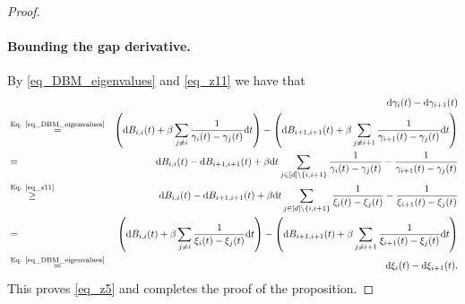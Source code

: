 \documentclass[11pt,letterpaper]{article}
\begin{document}
\begin{proof}
\paragraph{Bounding the gap derivative.}
%
By \eqref{eq_DBM_eigenvalues} and \eqref{eq_z11} we have that
%
\begin{eqnarray*}
& & \!\!\!\! \!\!\!\! \!\!\!\! \!\!\!\!  \!\!\!\! \!\!\!\! \!\!\!\! \!\!\!\!  \!\!\!\! \!\!\!\! \mathrm{d} \gamma_i(t) - \mathrm{d} \gamma_{i+1} (t) \nonumber\\
%
&\stackrel{\textrm{Eq. \eqref{eq_DBM_eigenvalues}}}{=}&  \left(\mathrm{d}B_{i, i}(t) +  \beta \sum_{j \neq i} \frac{1}{\gamma_i(t) - \gamma_j(t)} \mathrm{d}t \right) -  \left(\mathrm{d}B_{i+1, i+1}(t) +  \beta \sum_{j \neq i+1} \frac{1}{\gamma_{i+1}(t) - \gamma_j(t)} \mathrm{d}t \right)\\
%
&=& \mathrm{d}B_{i, i}(t)  - \mathrm{d}B_{i+1, i+1}(t)  + \beta  \mathrm{d}t  \sum_{j \in [d] \backslash \{i, i+1\}}   \frac{1}{\gamma_i(t) - \gamma_j(t)} -  \frac{1}{\gamma_{i+1}(t) - \gamma_j(t)}\\
%
&\stackrel{\textrm{Eq. \eqref{eq_z11}}}{\geq} &  \mathrm{d}B_{i, i}(t)  - \mathrm{d}B_{i+1, i+1}(t)  + \beta  \mathrm{d}t  \sum_{j \in [d] \backslash \{i, i+1\}}  \frac{1}{\xi_i(t)- \xi_{j}(t)} - \frac{1}{\xi_{i+1}(t)- \xi_{j}(t)}\\
%
&=&  \left(\mathrm{d}B_{i, i}(t) +  \beta \sum_{j \neq i} \frac{1}{\xi_i(t) - \xi_j(t)} \mathrm{d}t \right) -  \left(\mathrm{d}B_{i+1, i+1}(t) +  \beta \sum_{j \neq i+1} \frac{1}{\xi_{i+1}(t) - \xi_j(t)} \mathrm{d}t \right)\\
%
&\stackrel{\textrm{Eq. \eqref{eq_DBM_eigenvalues}}}{=}&  \mathrm{d} \xi_i(t) - \mathrm{d} \xi_{i+1} (t).
\end{eqnarray*}
%
This proves \eqref{eq_z5} and completes the proof of the proposition.
\end{proof}
\end{document}
